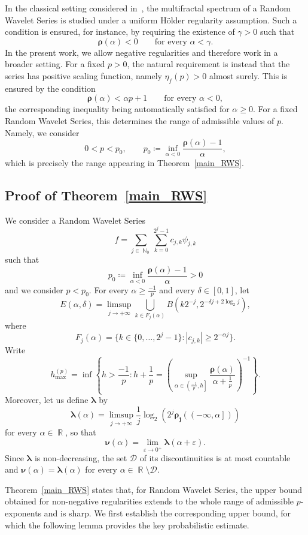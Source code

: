 \documentclass[a4paper,11pt,oneside]{article}
\DeclareMathOperator{\R}{\mathbb{R}}
\DeclareMathOperator{\N}{\mathbb{N}}
\newcommand{\ccint}[1]{\left[{#1}\right]}
\newcommand{\ocint}[1]{\left({#1}\right]}
\newcommand{\modu}[1]{\left\vert{#1}\right\vert}
\theoremstyle{definition}
\theoremstyle{plain}
\begin{document}
In the classical setting considered in~\cite{RWS}, the multifractal spectrum of a Random Wavelet Series is studied under a uniform H\"older regularity assumption. Such a condition is ensured, for instance, by requiring the existence of $\gamma>0$ such that
\[
\bm{\rho}(\alpha)<0
\qquad\text{for every }\alpha<\gamma.
\]
In the present work, we allow negative regularities and therefore work in a broader setting. For a fixed $p>0$, the natural requirement is instead that the series has positive scaling function, namely $\eta_f(p)>0$ almost surely. This is ensured by the condition
\[
\bm{\rho}(\alpha)<\alpha p+1
\qquad\text{for every }\alpha<0,
\]
the corresponding inequality being automatically satisfied for $\alpha\geq0$. For a fixed Random Wavelet Series, this determines the range of admissible values of $p$. Namely, we consider
\[
0<p<p_0,
\qquad
p_0\coloneqq
\inf_{\alpha<0}
\frac{\bm{\rho}(\alpha)-1}{\alpha},
\]
which is precisely the range appearing in Theorem~\ref{main_RWS}.

\subsection{Proof of Theorem~\ref{main_RWS}}\label{secpRWS}

We consider a Random Wavelet Series
\[
f=\sum_{j\in\N_0}\sum_{k=0}^{2^j-1}c_{j,k}\psi_{j,k}
\]
such that 
\[
p_0\coloneqq\inf_{\alpha<0}\frac{\bm{\rho}(\alpha)-1}{\alpha}>0
\]
and we consider $p<p_0$. For every $\alpha\geq \frac{-1}{p}$ and every $\delta\in\ccint{0,1}$, let
\[
E(\alpha,\delta)=\limsup_{j\rightarrow+\infty}\bigcup_{k\in F_j(\alpha)}B\left(k2^{-j},2^{-\delta j+2\log_2j}\right),
\]
where 
\[
F_j(\alpha)=\{k\in\{0,\ldots,2^j-1\}:\modu{c_{j,k}}\geq 2^{-\alpha j}\}.
\]
Write
\[
h_{\max}^{(p)}=\inf\left\{h>\frac{-1}{p}:h+\frac{1}{p}=\left(\sup_{\alpha\in\ocint{\frac{-1}{p},h}}\frac{\bm{\rho}(\alpha)}{\alpha+\frac{1}{p}}\right)^{-1}\right\}.
\]
Moreover, let us define $\bm{\lambda}$ by
\[
\bm{\lambda}(\alpha)=\limsup_{j\rightarrow+\infty}\frac{1}{j}\log_2\left(2^j\bm{\rho_j}(\ocint{-\infty,\alpha})\right)
\]
for every $\alpha\in\R$, so that 
\[
\bm{\nu}(\alpha)=\lim_{\varepsilon\rightarrow0^+}\bm{\lambda}(\alpha+\varepsilon).
\]
Since $\bm{\lambda}$ is non-decreasing, the set $\mathcal{D}$ of its discontinuities is at most countable and $\bm{\nu}(\alpha)=\bm{\lambda}(\alpha)$ for every $\alpha\in\R\setminus\mathcal{D}$. 

\medskip

Theorem~\ref{main_RWS} states that, for Random Wavelet Series, the upper bound obtained for non-negative regularities extends to the whole range of admissible $p$-exponents and is sharp. We first establish the corresponding upper bound, for which the following lemma provides the key probabilistic estimate.
\end{document}
